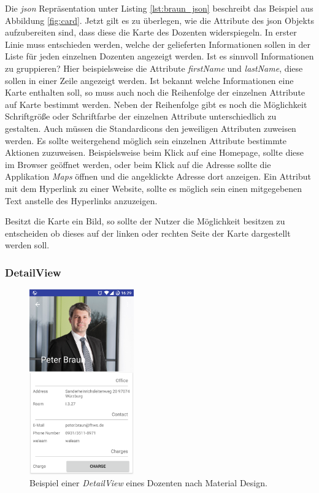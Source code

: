 Die  \textit{\acf{json}} Repräsentation unter Listing \ref{lst:braun_json} beschreibt das Beispiel aus Abbildung \ref{fig:card}.
Jetzt gilt es zu überlegen, wie die Attribute des \ac{json} Objekts aufzubereiten sind, dass diese die Karte des Dozenten widerspiegeln. 
In erster Linie muss entschieden werden, welche der gelieferten Informationen sollen in der Liste für jeden einzelnen Dozenten angezeigt werden. Ist es sinnvoll Informationen zu gruppieren? Hier beispielsweise die Attribute \textit{firstName} und \textit{lastName}, diese sollen in einer Zeile angezeigt werden. Ist bekannt welche Informationen eine Karte enthalten soll, so muss auch noch die Reihenfolge der einzelnen Attribute auf Karte bestimmt werden.
Neben der Reihenfolge gibt es noch die Möglichkeit Schriftgröße oder Schriftfarbe der einzelnen Attribute unterschiedlich zu gestalten. Auch müssen die Standardicons den jeweiligen Attributen zuweisen werden. Es sollte weitergehend möglich sein einzelnen Attribute bestimmte Aktionen zuzuweisen. Beispielsweise beim Klick auf eine Homepage, sollte diese im Browser geöffnet werden, oder beim Klick auf die Adresse sollte die Applikation \textit{Maps} öffnen und die angeklickte Adresse dort anzeigen. Ein Attribut mit dem Hyperlink zu einer Website, sollte es möglich sein einen mitgegebenen Text anstelle des Hyperlinks anzuzeigen. 

Besitzt die Karte ein Bild, so sollte der Nutzer die Möglichkeit besitzen zu entscheiden ob dieses auf der linken oder rechten Seite der Karte dargestellt werden soll.

\subsubsection{DetailView}

\begin{figure}[H]
	\begin{center}
		\includegraphics[width=0.4\textwidth]{images/detail.png}
		\caption{Beispiel einer \textit{DetailView} eines Dozenten nach Material Design.}
		\label{fig:detail}
	\end{center}
\end{figure}

